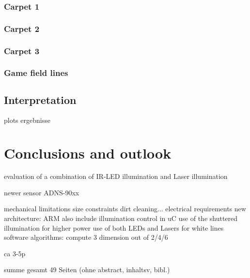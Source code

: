 \documentclass[12pt,a4paper]{article}
\begin{document}
\subsubsection{Carpet 1}

\subsubsection{Carpet 2}

\subsubsection{Carpet 3}

\subsubsection{Game field lines}

\subsection{Interpretation}

  plots
  ergebnisse

\clearpage
\section{Conclusions and outlook}

  evaluation of a combination of IR-LED illumination and Laser illumination

  newer sensor ADNS-90xx

  mechanical limitations
    size constraints
    dirt cleaning...
  electrical requirements
    new architecture: ARM
    also include illumination control in uC
      use of the shuttered illumination for higher power 
      use of both LEDs and Lasers for white lines
  software algorithms: compute 3 dimension out of 2/4/6

ca 3-5p


summe gesamt 49 Seiten (ohne abstract, inhaltsv, bibl.)


\clearpage
{}
\label{Bibliography}


%
\end{document}
